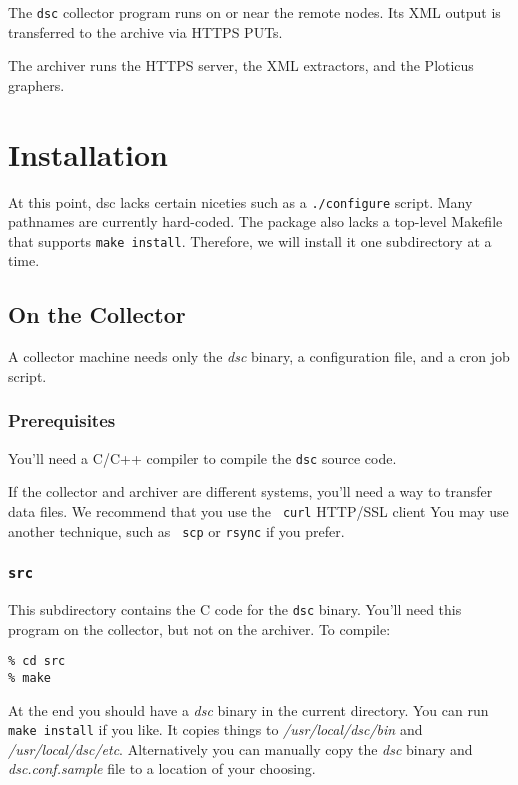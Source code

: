 \documentclass{report}
\def\dsc{{\sc dsc}}
\begin{document}
The {\tt dsc\/} collector program runs on or near the remote nodes.
Its XML output is transferred to the archive via HTTPS PUTs.

The archiver runs the HTTPS server, the XML extractors, and the
Ploticus graphers.


\chapter{Installation}

At this point, {\dsc} lacks certain niceties such as a {\tt ./configure\/}
script. Many pathnames are currently hard-coded.  The package
also lacks a top-level Makefile that supports {\tt make install\/}.
Therefore, we will install it one subdirectory at a time.

\section{On the Collector}

A collector machine needs only the {\em dsc\/} binary, a configuration file,
and a cron job script.

\subsection{Prerequisites}

You'll need a C/C++ compiler to compile the {\tt dsc\/} source code.

If the collector and archiver are different systems, you'll need a
way to transfer data files.  We recommend that you use the {\tt
curl\/} HTTP/SSL client You may use another technique, such as {\tt
scp\/} or {\tt rsync\/} if you prefer.

\subsection{\tt src}

This subdirectory contains the C code for the {\tt dsc\/} binary.
You'll need this program on the collector, but not on the archiver.
To compile:

\begin{verbatim}
% cd src
% make
\end{verbatim}

At the end you should have a {\em dsc\/} binary in the current directory.
You can run {\tt make install\/} if you like.  It copies things to
{\em /usr/local/dsc/bin\/} and {\em /usr/local/dsc/etc\/}.
Alternatively you can manually copy the {\em dsc\/} binary and {\em
dsc.conf.sample\/} file to a location of your choosing.
\end{document}
